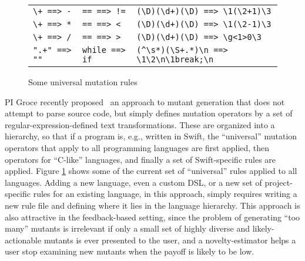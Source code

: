 \begin{figure}
\begin{tabularx}{0.75\textwidth}{XXX}
\verb|\+ ==> -| & \verb|== ==> !=| & \verb|(\D)(\d+)(\D) ==> \1(\2+1)\3|\\
\verb|\+ ==> *| & \verb|== ==> <| & \verb|(\D)(\d+)(\D) ==> \1(\2-1)\3|\\
\verb|\+ ==> /| & \verb|== ==> >| & \verb|(\D)(\d+)(\D) ==> \g<1>0\3|\\
\verb|".+" ==> ""| & \verb|while ==> if| & \verb|(^\s*)(\S+.*)\n ==> \1\2\n\1break;\n|\\
\end{tabularx}
\caption{Some universal mutation rules}
\label{fig:rules}
\end{figure}

PI Groce recently proposed~\cite{regexpMut} an approach to mutant generation that does not attempt to parse source code, but simply defines mutation operators by a set of regular-expression-defined text transformations.  These are organized into a hierarchy, so that if a program is, e.g., written in Swift, the ``universal'' mutation operators that apply to all programming languages are first applied, then operators for ``C-like'' languages, and finally a set of Swift-specific rules are applied.  Figure \ref{fig:rules} shows some of the current set of ``universal'' rules applied to all languages.  Adding a new language, even a custom DSL, or a new set of project-specific rules for an existing language, in this approach, simply requires writing a new rule file and defining where it lies in the language hierarchy.  This approach is also attractive in the feedback-based setting, since the problem of generating ``too many'' mutants is irrelevant if only a small set of highly diverse and likely-actionable mutants is ever presented to the user, and a novelty-estimator helps a user stop examining new mutants when the payoff is likely to be low.

